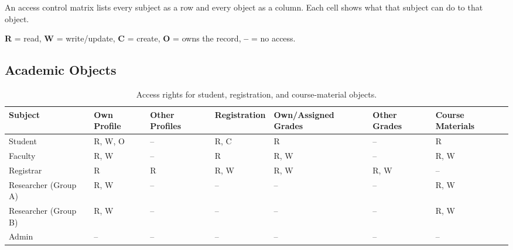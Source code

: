        An access control matrix lists every subject as a row and every object as a column. Each cell shows
        what that subject can do to that object.

        \begin{notebox}[Legend]
            \textbf{R} = read, \quad \textbf{W} = write/update, \quad \textbf{C} = create, \quad
            \textbf{O} = owns the record, \quad \textbf{--} = no access.
        \end{notebox}

        \subsection[MatrixAcademic]{Academic Objects}

            \begin{table}[h]
                \centering
                \small
                \begin{tabular}{
                    >{\raggedright\arraybackslash}p{1.9cm}
                    >{\centering\arraybackslash}p{1.5cm}
                    >{\centering\arraybackslash}p{1.5cm}
                    >{\centering\arraybackslash}p{2.0cm}
                    >{\centering\arraybackslash}p{1.7cm}
                    >{\centering\arraybackslash}p{1.4cm}
                    >{\centering\arraybackslash}p{1.6cm}
                }
                    \toprule
                    Subject & Own Profile & Other Profiles & Registration & Own/Assigned Grades & Other Grades & Course Materials \\
                    \midrule
                    Student & R, W, O & -- & R, C & R & -- & R \\
                    Faculty & R, W & -- & R & R, W & -- & R, W \\
                    Registrar & R & R & R, W & R, W & R, W & -- \\
                    Researcher (Group A) & R, W & -- & -- & -- & -- & R, W \\
                    Researcher (Group B) & R, W & -- & -- & -- & -- & R, W \\
                    Admin & -- & -- & -- & -- & -- & -- \\
                    \bottomrule
                \end{tabular}
                \caption{Access rights for student, registration, and course-material objects.}
                \label{tab:matrix-academic}
            \end{table}

